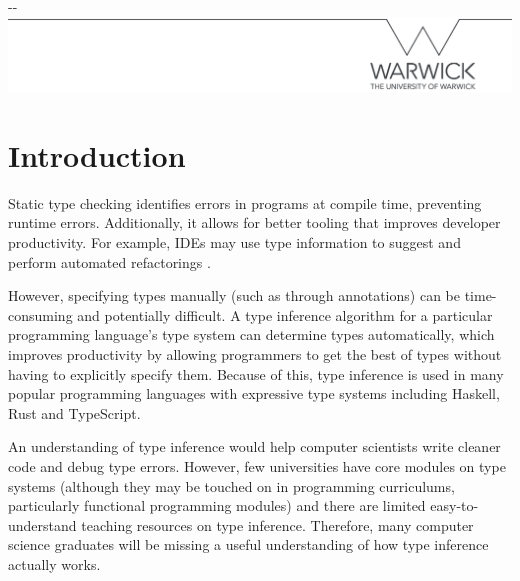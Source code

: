 \documentclass[a4paper,fleqn,12pt]{article}
\begin{document}
\makeatletter
\begin{titlepage}

\LARGE \@title \\
\Large \\[1.5cm]

\vfill 

\begin{adjustwidth}{-\oddsidemargin-1in}{-\rightmargin}
  \centering
  \includegraphics[width=\paperwidth]{line.png}
\end{adjustwidth}

\vspace*{-3.5cm}

\end{titlepage}
\makeatother

\pagestyle{plain}

\section{Introduction}\label{id:h.6k9gcmunzldy}

Static type checking identifies errors in programs at compile time, preventing runtime errors. Additionally, it allows for better tooling that improves developer productivity. For example, IDEs may use type information to suggest and perform automated refactorings \citep{ref1}.

However, specifying types manually (such as through annotations) can be time-consuming and potentially difficult. A type inference algorithm for a particular programming language’s type system can determine types automatically, which improves productivity by allowing programmers to get the best of types without having to explicitly specify them. Because of this, type inference is used in many popular programming languages with expressive type systems including Haskell, Rust and TypeScript.

An understanding of type inference would help computer scientists write cleaner code and debug type errors. However, few universities have core modules on type systems (although they may be touched on in programming curriculums, particularly functional programming modules) and there are limited easy-to-understand teaching resources on type inference. Therefore, many computer science graduates will be missing a useful understanding of how type inference actually works.
\end{document}
